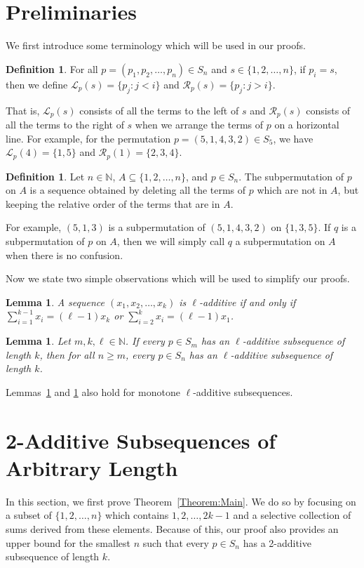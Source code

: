 \documentclass[11pt]{article}
\newtheorem{lemma}[theorem]{Lemma}
\theoremstyle{definition}
\newtheorem{definition}[theorem]{Definition}
\begin{document}
\section{Preliminaries}\label{Section:Pre}

We first introduce some terminology which will be used in our proofs.

\begin{definition}
    For all $p=(p_1,p_2,\ldots,p_n)\in S_n$ and $s\in\{1,2,\ldots,n\}$, if $p_i=s$, then we define $\mathcal{L}_p(s)=\{p_j:j<i\}$ and $\mathcal{R}_p(s)=\{p_j:j>i\}$.
\end{definition}
That is, $\mathcal{L}_p(s)$ consists of all the terms to the left of $s$ and $\mathcal{R}_p(s)$ consists of all the terms to the right of $s$ when we arrange the terms of $p$ on a horizontal line. For example, for the permutation $p=(5,1,4,3,2)\in S_5$, we have $\mathcal{L}_p(4)=\{1,5\}$ and $\mathcal{R}_p(1)=\{2,3,4\}$.

\begin{definition}
    Let $n\in\mathbb{N}$, $A\subseteq\{1,2,\ldots,n\}$, and $p\in S_n$. The subpermutation of $p$ on $A$ is a sequence obtained by deleting all the terms of $p$ which are not in $A$, but keeping the relative order of the terms that are in $A$.
\end{definition}
For example, $(5,1,3)$ is a subpermutation of $(5,1,4,3,2)$ on $\{1,3,5\}$. If $q$ is a subpermutation of $p$ on $A$, then we will simply call $q$ a subpermutation on $A$ when there is no confusion.


Now we state two simple observations which will be used to simplify our proofs.
\begin{lemma}\label{Lemma:Fromltol-1}
    A sequence $(x_1,x_2,\ldots,x_k)$ is $\ell$-additive if and only if $\sum_{i=1}^{k-1}x_i=(\ell-1)x_k$ or $\sum_{i=2}^kx_i=(\ell-1)x_1$.
\end{lemma}
\begin{lemma}\label{Lemma:FromAll-nToSome-n}
Let $m,k,\ell\in\mathbb{N}$. If every $p\in S_m$ has an $\ell$-additive subsequence of length $k$, then for all $n\geq m$, every $p\in S_n$ has an $\ell$-additive subsequence of length $k$. 
\end{lemma}

Lemmas~\ref{Lemma:Fromltol-1} and \ref{Lemma:FromAll-nToSome-n} also hold for monotone $\ell$-additive subsequences.
\section{2-Additive Subsequences of Arbitrary Length}\label{Section:2-Add}
In this section, we first prove Theorem~\ref{Theorem:Main}. We do so by focusing on a subset of $\{1,2,\ldots,n\}$ which contains $1,2,\ldots,2k-1$ and a selective collection of sums derived from these elements. Because of this, our proof also provides an upper bound for the smallest $n$ such that every $p\in S_n$ has a 2-additive subsequence of length $k$. 
\end{document}
